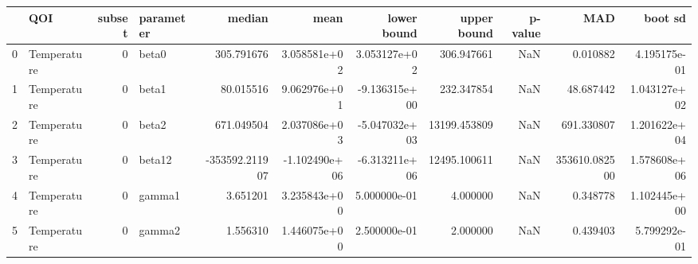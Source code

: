 \begin{tabular}{llrlrrrrrrr}
\toprule
{} &          QOI &  subset & parameter &         median &          mean &   lower bound &   upper bound &  p-value &            MAD &       boot sd \\
\midrule
0 &  Temperature &       0 &     beta0 &     305.791676 &  3.058581e+02 &  3.053127e+02 &    306.947661 &      NaN &       0.010882 &  4.195175e-01 \\
1 &  Temperature &       0 &     beta1 &      80.015516 &  9.062976e+01 & -9.136315e+00 &    232.347854 &      NaN &      48.687442 &  1.043127e+02 \\
2 &  Temperature &       0 &     beta2 &     671.049504 &  2.037086e+03 & -5.047032e+03 &  13199.453809 &      NaN &     691.330807 &  1.201622e+04 \\
3 &  Temperature &       0 &    beta12 & -353592.211907 & -1.102490e+06 & -6.313211e+06 &  12495.100611 &      NaN &  353610.082500 &  1.578608e+06 \\
4 &  Temperature &       0 &    gamma1 &       3.651201 &  3.235843e+00 &  5.000000e-01 &      4.000000 &      NaN &       0.348778 &  1.102445e+00 \\
5 &  Temperature &       0 &    gamma2 &       1.556310 &  1.446075e+00 &  2.500000e-01 &      2.000000 &      NaN &       0.439403 &  5.799292e-01 \\
\bottomrule
\end{tabular}
